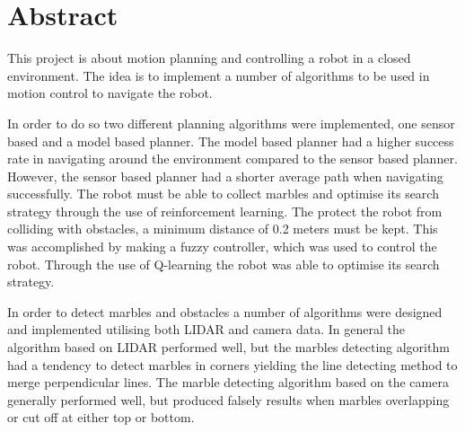 \documentclass[../Head/Main.tex]{subfiles}
\begin{document}
\section{Abstract}

This project is about motion planning and controlling a robot in a closed environment. The idea is to implement a number of algorithms to be used in motion control to navigate the robot.

In order to do so two different planning algorithms were implemented, one sensor based and a model based planner. The model based planner had a higher success rate in navigating around the environment compared to the sensor based planner. However, the sensor based planner had a shorter average path when navigating successfully. The robot must be able to collect marbles and optimise its search strategy through the use of reinforcement learning. The protect the robot from colliding with obstacles, a minimum distance of 0.2 meters must be kept. This was accomplished by making a fuzzy controller, which was used to control the robot. Through the use of Q-learning the robot was able to optimise its search strategy. 

In order to detect marbles and obstacles a number of algorithms were designed and implemented utilising both LIDAR and camera data. In general the algorithm based on LIDAR performed well, but the marbles detecting algorithm had a tendency to detect marbles in corners yielding the line detecting method to merge perpendicular lines. The marble detecting algorithm based on the camera generally performed well, but produced falsely results when marbles overlapping or cut off at either top or bottom.  
\end{document}
